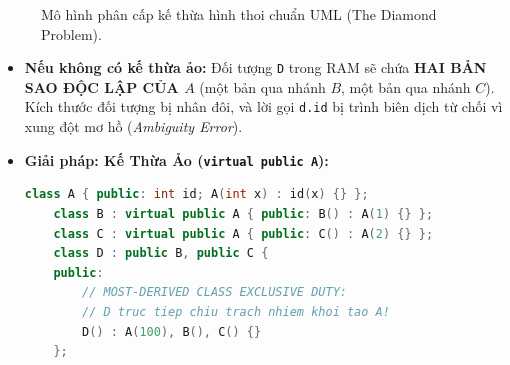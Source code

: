 \documentclass[12pt,a4paper,oneside]{book}
\begin{document}
\begin{figure}[htbp]
\centering
{}
\caption{Mô hình phân cấp kế thừa hình thoi chuẩn UML (The Diamond Problem).}
\end{figure}

\begin{itemize}
    \item \textbf{Nếu không có kế thừa ảo:} Đối tượng \texttt{D} trong RAM sẽ chứa \textbf{HAI BẢN SAO ĐỘC LẬP CỦA $A$} (một bản qua nhánh $B$, một bản qua nhánh $C$). Kích thước đối tượng bị nhân đôi, và lời gọi \texttt{d.id} bị trình biên dịch từ chối vì xung đột mơ hồ (\textit{Ambiguity Error}).
    \item \textbf{Giải pháp: Kế Thừa Ảo (\texttt{virtual public A}):}
    \begin{lstlisting}[language=C++]
    class A { public: int id; A(int x) : id(x) {} };
    class B : virtual public A { public: B() : A(1) {} };
    class C : virtual public A { public: C() : A(2) {} };
    class D : public B, public C {
    public:
        // MOST-DERIVED CLASS EXCLUSIVE DUTY:
        // D truc tiep chiu trach nhiem khoi tao A!
        D() : A(100), B(), C() {}
    };
    \end{lstlisting}
\end{itemize}
\end{document}
